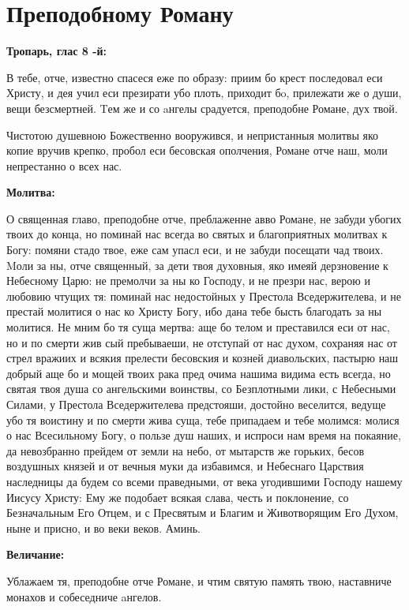 \section{Преподобному Роману}
 
\bfseries Тропарь, глас 8 -й:\normalfont{}


В тебе, отче, известно спасеся еже по образу: приим бо крест последовал еси Христу,  и дея учил еси презирати убо плоть, приходит бo, прилежати же о души, вещи безсмертней. Tем же и со aнгелы срадуется, преподобне Романе, дух твой.


Чистотою душевною Божественно вооружився, и непристанныя молитвы яко копие вручив крепко, пробол еси бесовская ополчения, Романе отче наш, моли непрестанно о всех нас.


\medskip
\bfseries Молитва:\normalfont{}


О священная главо, преподобне отче, преблаженне авво Романе, не забуди убогих твоих до конца, но поминай нас всегда во святых и благоприятных молитвах к Богу: помяни стадо твое, еже сам упасл еси, и не забуди посещати чад твоих. Mоли за ны, отче священный, за дети твоя духовныя, яко имеяй дерзновение к Небесному Царю: не премолчи за ны ко Господу, и не презри нас, верою и любовию чтущих тя: поминай нас недостойных у Престола Вседержителева, и не престай молитися о нас ко Христу Богу, ибо дана тебе бысть благодать за ны молитися. Не мним бо тя суща мертва: аще бо телом и преставился еси от нас, но и по смерти жив сый пребываеши, не отступай от нас духом, сохраняя нас от стрел вражиих и всякия прелести бесовския и козней диавольских, пастырю наш добрый аще бо и мощей твоих рака пред очима нашима видима есть всегда, но святая твоя душа со ангельскими воинствы, со Безплотными лики, с Небесными Силами, у Престола Вседержителева предстояши, достойно веселится, ведуще убо тя воистину и по смерти жива суща, тебе припадаем и тебе молимся: молися о нас Всесильному Богу, о пользе душ наших, и испроси нам время на покаяние, да невозбранно прейдем от земли на небо, от мытарств же горьких, бесов воздушных князей и от вечныя муки да избавимся, и Небеснаго Царствия наследницы да будем со всеми праведными, от века угодившими Господу нашему Иисусу Христу: Ему же подобает всякая слава, честь и поклонение, со Безначальным Его Отцем, и с Пресвятым и Благим и Животворящим Его Духом, ныне и присно, и во веки веков. Аминь.


\medskip
\bfseries Величание:\normalfont{}


Ублажаем тя, преподобне отче Романе, и чтим святую память твою, наставниче монахов и собеседниче aнгелов.

